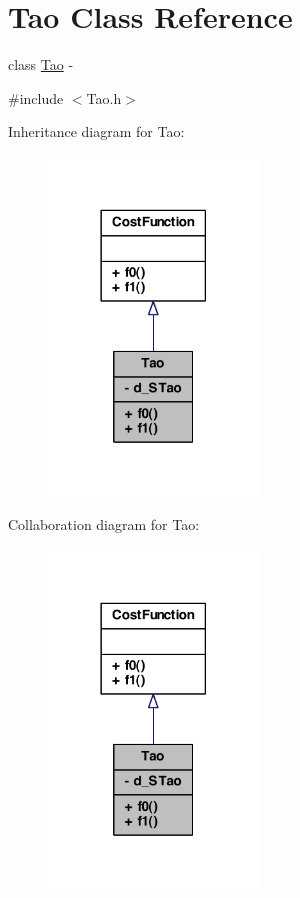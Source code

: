 \hypertarget{class_tao}{
\section{Tao Class Reference}
\label{class_tao}
}


class \hyperlink{class_tao}{Tao} -\/  




{\ttfamily \#include $<$Tao.h$>$}



Inheritance diagram for Tao:
\nopagebreak
\begin{figure}[H]
\begin{center}
\leavevmode
\includegraphics[width=158pt]{class_tao__inherit__graph}
\end{center}
\end{figure}


Collaboration diagram for Tao:
\nopagebreak
\begin{figure}[H]
\begin{center}
\leavevmode
\includegraphics[width=158pt]{class_tao__coll__graph}
\end{center}
\end{figure}
